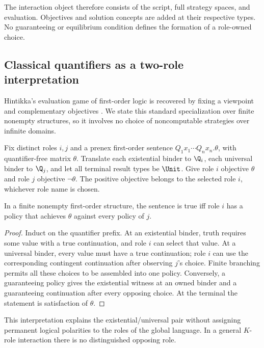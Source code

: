 The interaction object therefore consists of the script, full strategy
spaces, and evaluation. Objectives and solution concepts are added at their
respective types. No guaranteeing or equilibrium condition defines the
formation of a role-owned choice.

\subsection{Classical quantifiers as a two-role interpretation}

Hintikka's evaluation game of first-order logic is recovered by fixing
a viewpoint and complementary objectives \cite{Hintikka1973}. We state this standard
specialization over finite nonempty structures, so it involves no choice of
noncomputable strategies over infinite domains.

Fix distinct roles $i,j$ and a prenex first-order sentence
$Q_1x_1\cdots Q_nx_n.\theta$, with quantifier-free matrix $\theta$.
Translate each existential binder to $\Q_i$, each universal binder to
$\Q_j$, and let all terminal result types be $\Unit$. Give role $i$ objective
$\theta$ and role $j$ objective $\neg\theta$. The positive objective belongs
to the selected role $i$, whichever role name is chosen.

\begin{proposition}
In a finite nonempty first-order structure, the sentence is true iff role
$i$ has a policy that achieves $\theta$ against every policy of $j$.
\end{proposition}
\begin{proof}
Induct on the quantifier prefix. At an existential binder, truth requires
some value with a true continuation, and role $i$ can select that value.
At a universal binder, every value must have a true continuation; role $i$
can use the corresponding contingent continuation after observing $j$'s
choice. Finite branching permits all these choices to be assembled into
one policy. Conversely, a guaranteeing policy gives the existential witness
at an owned binder and a guaranteeing continuation after every opposing
choice. At the terminal the statement is satisfaction of $\theta$.
\end{proof}

This interpretation explains the existential/universal pair without assigning
permanent logical polarities to the roles of the global language. In a
general $K$-role interaction there is no distinguished opposing role.


